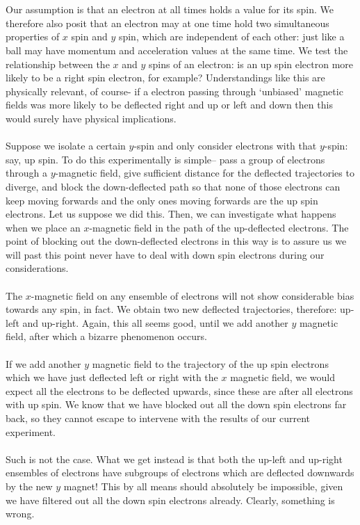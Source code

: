 \\\\
Our assumption is that an electron at all times holds a value for its spin. We therefore also posit that an electron may at one time hold two simultaneous properties of $x$ spin and $y$ spin, which are independent of each other: just like a ball may have momentum and acceleration values at the same time. We test the relationship between the $x$ and $y$ spins of an electron: is an up spin electron more likely to be a right spin electron, for example? Understandings like this are physically relevant, of course- if a electron passing through `unbiased' magnetic fields was more likely to be deflected right and up or left and down then this would surely have physical implications. 
\\\\
Suppose we isolate a certain $y$-spin and only consider electrons with that $y$-spin: say, up spin. To do this experimentally is simple-- pass a group of electrons through a $y$-magnetic field, give sufficient distance for the deflected trajectories to diverge, and block the down-deflected path so that none of those electrons can keep moving forwards and the only ones moving forwards are the up spin electrons. Let us suppose we did this. Then, we can investigate what happens when we place an $x$-magnetic field in the path of the up-deflected electrons. The point of blocking out the down-deflected electrons in this way is to assure us we will past this point never have to deal with down spin electrons during our considerations.
\\\\
The $x$-magnetic field on any ensemble of electrons will not show considerable bias towards any spin, in fact. We obtain two new deflected trajectories, therefore: up-left and up-right. Again, this all seems good, until we add another $y$ magnetic field, after which a bizarre phenomenon occurs.
\\\\
If we add another $y$ magnetic field to the trajectory of the up spin electrons which we have just deflected left or right with the $x$ magnetic field, we would expect all the electrons to be deflected upwards, since these are after all electrons with up spin. We know that we have blocked out all the down spin electrons far back, so they cannot escape to intervene with the results of our current experiment.
\\\\
Such is not the case. What we get instead is that both the up-left and up-right ensembles of electrons have subgroups of electrons which are deflected downwards by the new $y$ magnet! This by all means should absolutely be impossible, given we have filtered out all the down spin electrons already. Clearly, something is wrong. 
